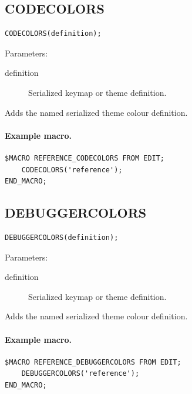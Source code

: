 \documentclass[a4paper,10pt,twoside,openany]{book}
\newenvironment{mrmacextension}{\begin{changebar}}{\end{changebar}}
\begin{document}
\begin{mrmacextension}
\label{prim:procedure-codecolors}
\subsection*{CODECOLORS}
\begin{verbatim}
CODECOLORS(definition);
\end{verbatim}
Parameters:
\begin{description}
\item[definition] Serialized keymap or theme definition.
\end{description}

Adds the named serialized theme colour definition.

\end{mrmacextension}

\paragraph{Example macro.}
\begin{verbatim}
$MACRO REFERENCE_CODECOLORS FROM EDIT;
    CODECOLORS('reference');
END_MACRO;
\end{verbatim}

\begin{mrmacextension}
\label{prim:procedure-debuggercolors}
\subsection*{DEBUGGERCOLORS}
\begin{verbatim}
DEBUGGERCOLORS(definition);
\end{verbatim}
Parameters:
\begin{description}
\item[definition] Serialized keymap or theme definition.
\end{description}

Adds the named serialized theme colour definition.

\paragraph{Example macro.}
\begin{verbatim}
$MACRO REFERENCE_DEBUGGERCOLORS FROM EDIT;
    DEBUGGERCOLORS('reference');
END_MACRO;
\end{verbatim}
\end{mrmacextension}
\end{document}
